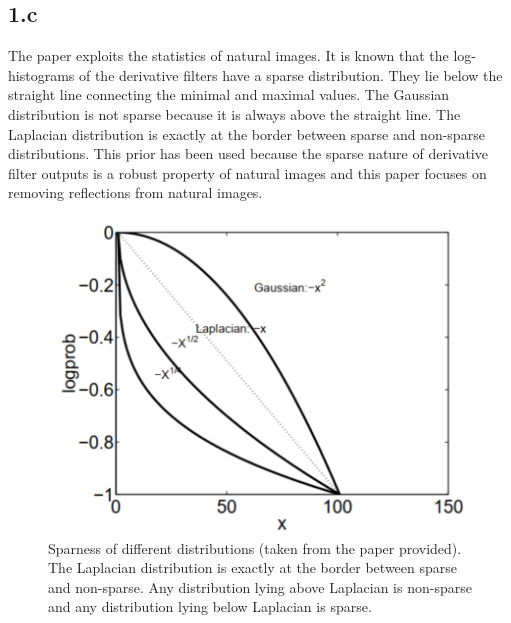 \documentclass[12pt]{article}
\begin{document}
\subsection*{1.c}
The paper exploits the statistics of natural images. It is known that the log-histograms of the derivative filters have a sparse distribution. They lie below the straight line connecting the minimal and maximal values. The Gaussian distribution is not sparse because it is always above the straight line. The Laplacian distribution is exactly at the border between sparse and non-sparse distributions. This prior has been used because the sparse nature of derivative filter outputs is a robust property of natural images and this paper focuses on removing reflections from natural images.
\begin{figure}[ht]
	\centering
	\includegraphics[scale=1]{log_histograms.png}
	\caption{Sparness of different distributions (taken from the paper provided). The Laplacian distribution is exactly at the border between sparse and non-sparse. Any distribution lying above Laplacian is non-sparse and any distribution lying below Laplacian is sparse.}
\end{figure}
\end{document}
